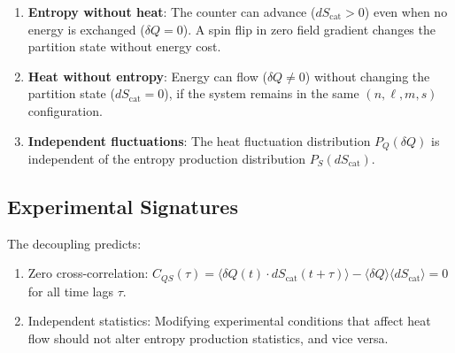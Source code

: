 \begin{enumerate}
    \item \textbf{Entropy without heat}: The counter can advance ($dS_{\mathrm{cat}} > 0$) even when no energy is exchanged ($\delta Q = 0$). A spin flip in zero field gradient changes the partition state without energy cost.

    \item \textbf{Heat without entropy}: Energy can flow ($\delta Q \neq 0$) without changing the partition state ($dS_{\mathrm{cat}} = 0$), if the system remains in the same $(n, \ell, m, s)$ configuration.

    \item \textbf{Independent fluctuations}: The heat fluctuation distribution $P_Q(\delta Q)$ is independent of the entropy production distribution $P_S(dS_{\mathrm{cat}})$.
\end{enumerate}

\subsection{Experimental Signatures}

The decoupling predicts:

\begin{enumerate}
    \item Zero cross-correlation: $C_{QS}(\tau) = \langle \delta Q(t) \cdot dS_{\mathrm{cat}}(t+\tau) \rangle - \langle \delta Q \rangle \langle dS_{\mathrm{cat}} \rangle = 0$ for all time lags $\tau$.

    \item Independent statistics: Modifying experimental conditions that affect heat flow should not alter entropy production statistics, and vice versa.
\end{enumerate}

